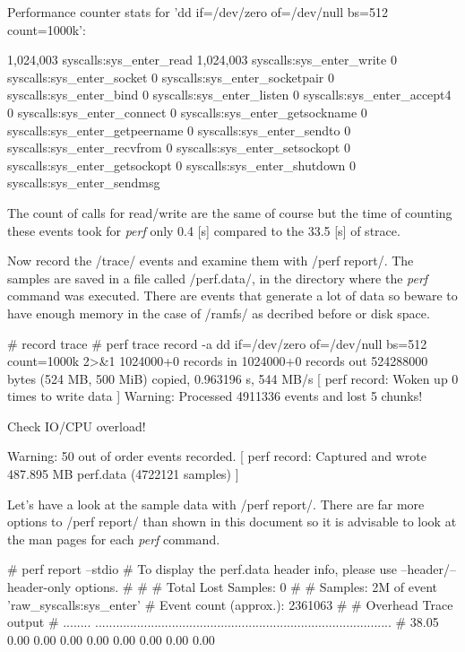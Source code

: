  Performance counter stats for 'dd if=/dev/zero of=/dev/null bs=512 count=1000k':

         1,024,003      syscalls:sys_enter_read
         1,024,003      syscalls:sys_enter_write
                 0      syscalls:sys_enter_socket
                 0      syscalls:sys_enter_socketpair
                 0      syscalls:sys_enter_bind
                 0      syscalls:sys_enter_listen
                 0      syscalls:sys_enter_accept4
                 0      syscalls:sys_enter_connect
                 0      syscalls:sys_enter_getsockname
                 0      syscalls:sys_enter_getpeername
                 0      syscalls:sys_enter_sendto
                 0      syscalls:sys_enter_recvfrom
                 0      syscalls:sys_enter_setsockopt
                 0      syscalls:sys_enter_getsockopt
                 0      syscalls:sys_enter_shutdown
                 0      syscalls:sys_enter_sendmsg
\stoptyping

The count of calls for read/write are the same of course but the time
of counting these events took for {\em perf} only 0.4 [s] compared to the
33.5 [s] of strace.

Now record the /trace/ events and examine them with /perf report/. The
samples are saved in a file called /perf.data/, in the directory where
the {\em perf} command was executed. There are events that generate a lot of
data so beware to have enough memory in the case of /ramfs/ as decribed
before or disk space.

\starttyping
# record trace
# perf trace record -a dd if=/dev/zero of=/dev/null bs=512 count=1000k 2>&1
1024000+0 records in
1024000+0 records out
524288000 bytes (524 MB, 500 MiB) copied, 0.963196 s, 544 MB/s
[ perf record: Woken up 0 times to write data ]
Warning:
Processed 4911336 events and lost 5 chunks!

Check IO/CPU overload!

Warning:
50 out of order events recorded.
[ perf record: Captured and wrote 487.895 MB perf.data (4722121 samples) ]
\stoptyping

Let's have a look at the sample data with /perf report/. There are far
more options to /perf report/ than shown in this document so it is
advisable to look at the man pages for each {\em perf} command.


\starttyping
# perf report  --stdio
# To display the perf.data header info, please use --header/--header-only options.
#
#
# Total Lost Samples: 0
#
# Samples: 2M of event 'raw_syscalls:sys_enter'
# Event count (approx.): 2361063
#
# Overhead  Trace output
# ........  .....................................................................................
#
    38.05%
     0.00%
     0.00%
     0.00%
     0.00%
     0.00%
     0.00%
     0.00%
     0.00%

